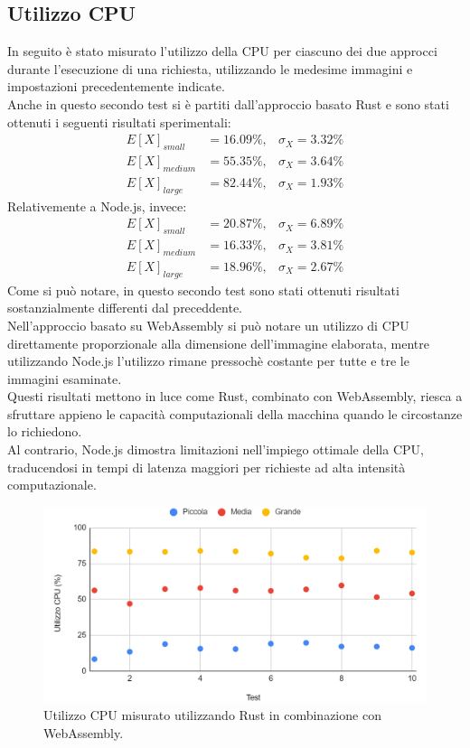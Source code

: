 \subsection{Utilizzo CPU}
In seguito è stato misurato l'utilizzo della CPU per ciascuno dei due approcci durante l'esecuzione di una richiesta, utilizzando le medesime immagini e impostazioni precedentemente indicate.
\\Anche in questo secondo test si è partiti dall'approccio basato Rust e sono stati ottenuti i seguenti risultati sperimentali:
\begin{align*}
    E[X]_{small}&=16.09\%,  & \sigma_X=3.32\%\\
    E[X]_{medium}&=55.35\%, & \sigma_X=3.64\%\\
    E[X]_{large}&=82.44\%,  & \sigma_X=1.93\%
\end{align*}
Relativemente a Node.js, invece:
\begin{align*}
    E[X]_{small}&=20.87\%,  & \sigma_X=6.89\%\\
    E[X]_{medium}&=16.33\%, & \sigma_X=3.81\%\\
    E[X]_{large}&=18.96\%,  & \sigma_X=2.67\%
\end{align*}
Come si può notare, in questo secondo test sono stati ottenuti risultati sostanzialmente differenti dal preceddente.
\\Nell'approccio basato su WebAssembly si può notare un utilizzo di CPU direttamente proporzionale alla dimensione dell'immagine elaborata, mentre utilizzando Node.js l'utilizzo rimane pressochè costante per tutte e tre le immagini esaminate.
\\Questi risultati mettono in luce come Rust, combinato con WebAssembly, riesca a sfruttare appieno le capacità computazionali della macchina quando le circostanze lo richiedono.
\\Al contrario, Node.js dimostra limitazioni nell'impiego ottimale della CPU, traducendosi in tempi di latenza maggiori per richieste ad alta intensità computazionale.
\begin{figure}
    \begin{center}
            \includegraphics[width=1\columnwidth]{images/rust_cpu.png}
    \end{center}
    \caption{Utilizzo CPU misurato utilizzando Rust in combinazione con WebAssembly.}
\end{figure}
